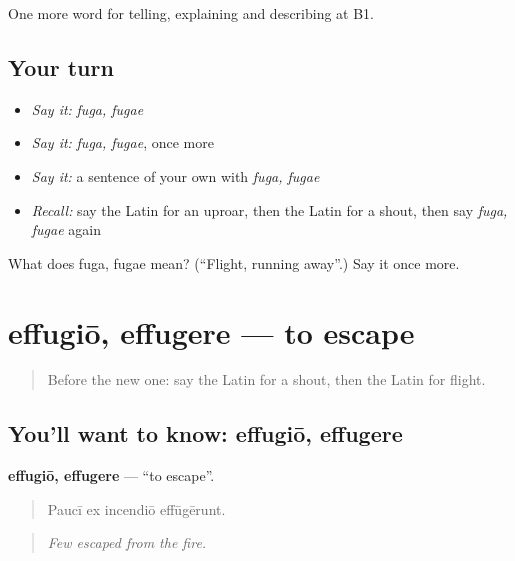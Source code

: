 \begin{grammarlens}[title={What you've built}]
One more word for telling, explaining and describing at B1.
\end{grammarlens}

\subsection*{Your turn}
\begin{itemize}
\raggedright
  \item \emph{Say it:} \emph{fuga, fugae}
  \item \emph{Say it:} \emph{fuga, fugae}, once more
  \item \emph{Say it:} a sentence of your own with \emph{fuga, fugae}
  \item \emph{Recall:} say the Latin for an uproar, then the Latin for a shout, then say \emph{fuga, fugae} again
\end{itemize}

\begin{tcolorbox}[breakable,colback=teal!4,colframe=teal!35!black,title={Before you move on}]
What does fuga, fugae mean? (\textquotedblleft{}Flight, running away\textquotedblright{}.) Say it once more.
\end{tcolorbox}
\section[effugiō, effugere]{effugiō, effugere — to escape}

\label{lesson:LA-C322-effugio}



\begin{quote}
Before the new one: say the Latin for a shout, then the Latin for flight.
\end{quote}

\subsection*{You'll want to know: effugiō, effugere}
\textbf{effugiō, effugere} — \textquotedblleft{}to escape\textquotedblright{}.

\begin{quote}
Paucī ex incendiō effūgērunt.
\end{quote}

\begin{quote}
\emph{Few escaped from the fire.}
\end{quote}


